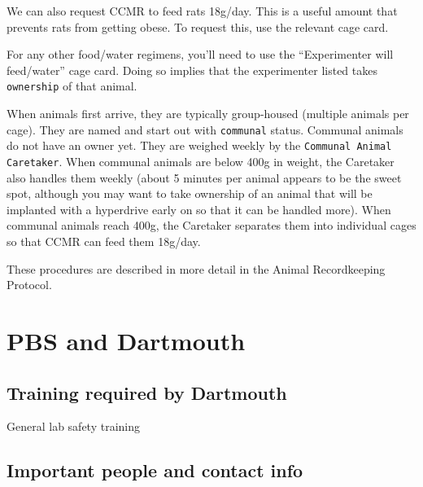 \documentclass{tufte-book}
\newcommand{\doccls}[1]{\texttt{#1}}%
\begin{document}
We can also request CCMR to feed rats 18g/day. This is a useful amount
that prevents rats from getting obese. To request this, use the
relevant cage card.

For any other food/water regimens, you'll need to use the
``Experimenter will feed/water'' cage card. Doing so implies that the
experimenter listed takes \doccls{ownership} of that animal.

When animals first arrive, they are typically group-housed (multiple
animals per cage). They are named and start out with \doccls{communal}
status. Communal animals do not have an owner yet. They are weighed
weekly by the \doccls{Communal Animal Caretaker}. When communal animals are below 400g
in weight, the Caretaker also handles them weekly (about 5 minutes per
animal appears to be the sweet spot, although you may want to take
ownership of an animal that will be implanted with a hyperdrive early
on so that it can be handled more). When communal animals reach 400g,
the Caretaker separates them into individual cages so that CCMR can
feed them 18g/day.

These procedures are described in more detail in the Animal
Recordkeeping Protocol.

\chapter{PBS and Dartmouth}

\section{Training required by Dartmouth}

General lab safety training

\section{Important people and contact info}
\end{document}
